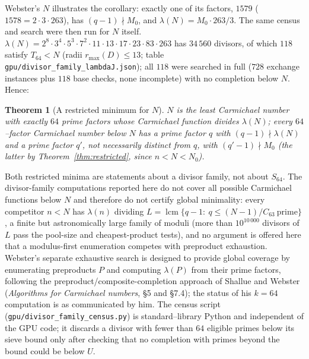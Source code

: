 \documentclass[11pt]{article}
\newtheorem{theorem}{Theorem}
\theoremstyle{definition}
\newcommand{\Smin}{S_{64}}
\newcommand{\code}[1]{\texttt{#1}}
\begin{document}
Webster's $N$ illustrates the corollary: exactly one of its factors, $1579$ ($1578=2\cdot3\cdot263$),
has $(q-1)\nmid M_0$, and $\lambda(N)=M_0\cdot 263/3$.
The same census and search were then run for $N$ itself. $\lambda(N)=2^8\cdot3^4\cdot5^3\cdot7^2\cdot11\cdot13\cdot17\cdot23\cdot83\cdot263$ has $34\,560$
divisors, of which $118$ satisfy $T_{64}<N$ (radii $r_{\max}(D)\le 13$; table
\code{gpu/divisor\_family\_lambdaJ.json}); all $118$ were searched in full ($728$ exchange instances plus
$118$ base checks, none incomplete) with no completion below $N$. Hence:

\begin{theorem}[A restricted minimum for $N$]\label{thm:restrictedN}
$N$ is the least Carmichael number with exactly $64$ prime factors whose Carmichael function divides
$\lambda(N)$; every $64$--factor Carmichael number below $N$ has a prime factor $q$ with
$(q-1)\nmid\lambda(N)$ and a prime factor $q'$, not necessarily distinct from $q$, with $(q'-1)\nmid M_0$
(the latter by Theorem~\ref{thm:restricted}, since $n<N<N_0$).
\end{theorem}

Both restricted minima are statements about a divisor family, not about $\Smin$. The divisor-family
computations reported here do not cover all possible Carmichael functions below $N$ and therefore do
not certify global minimality: every competitor $n<N$ has $\lambda(n)$ dividing $L=\operatorname{lcm}\{q-1:\ q\le
(N-1)/C_{63}\ \text{prime}\}$, a finite but astronomically large family of moduli (more than $10^{10\,000}$
divisors of $L$ pass the pool-size and cheapest-product tests), and no argument is offered here that a
modulus-first enumeration competes with preproduct exhaustion. Webster's separate exhaustive search is
designed to provide global coverage by enumerating preproducts $P$ and computing $\lambda(P)$ from their
prime factors, following the preproduct/composite-completion approach of Shallue and Webster
(\emph{Algorithms for Carmichael numbers}, \S5 and \S7.4); the status of his $k=64$ computation is as
communicated by him. The census script
(\code{gpu/divisor\_family\_census.py}) is standard--library Python and independent of the GPU code;
it discards a divisor with fewer than $64$ eligible primes below its sieve bound only after checking
that no completion with primes beyond the bound could be below $U$.
\end{document}
